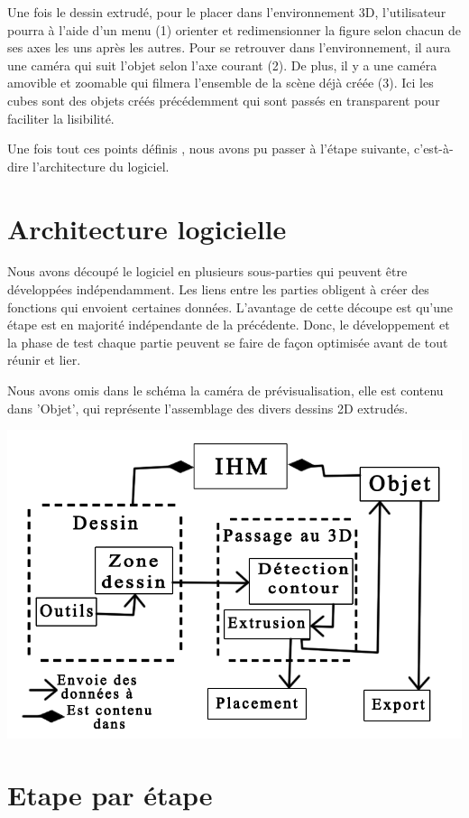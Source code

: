 \documentclass[a4paper,11pt]{article}
\begin{document}
		Une fois le dessin extrudé, pour le placer dans l'environnement 3D, l'utilisateur pourra à l'aide d'un menu (1) orienter et redimensionner la figure selon chacun de ses axes les uns après les autres. Pour se retrouver dans l'environnement, il aura une caméra qui suit l'objet selon l'axe courant (2). De plus, il y a une caméra amovible et zoomable qui filmera l'ensemble de la scène déjà créée (3). Ici les cubes sont des objets créés précédemment qui sont passés en transparent pour faciliter la lisibilité.
		\newline

		Une fois tout ces points définis , nous avons pu passer à l'étape suivante, c'est-à-dire l'architecture du logiciel.
		
	\section{Architecture logicielle}
		Nous avons découpé le logiciel en plusieurs sous-parties qui peuvent être développées indépendamment. Les liens entre les parties obligent à créer des fonctions qui envoient certaines données. L'avantage de cette découpe est qu'une étape est en majorité indépendante de la précédente. Donc, le développement et la phase de test chaque partie peuvent se faire de façon optimisée avant de tout réunir et lier.
		
		Nous avons omis dans le schéma la caméra de prévisualisation, elle est contenu dans 'Objet', qui représente l'assemblage des divers dessins 2D extrudés.

				\centerline{\includegraphics[scale=0.5]{images/archi.png}}


	\section{Etape par étape}
\end{document}
